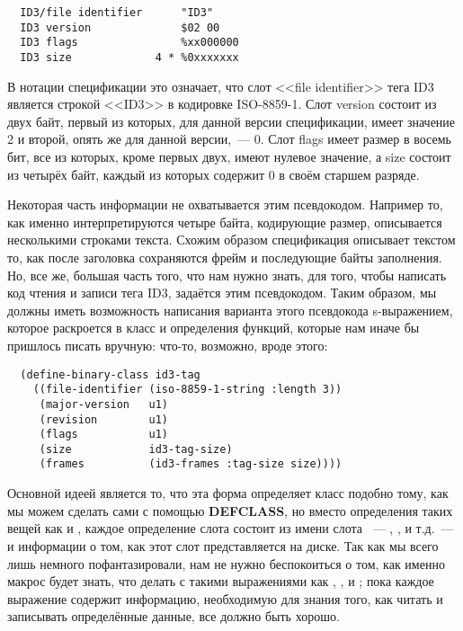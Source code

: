 \begin{verbatim}
  ID3/file identifier      "ID3"
  ID3 version              $02 00
  ID3 flags                %xx000000
  ID3 size             4 * %0xxxxxxx
\end{verbatim}

В нотации спецификации это означает, что слот <<file identifier>> тега ID3 является строкой
<<ID3>> в кодировке ISO-8859-1. Слот version состоит из двух байт, первый из которых, для
данной версии спецификации, имеет значение 2 и второй, опять же для данной версии,~---
0. Слот flags имеет размер в восемь бит, все из которых, кроме первых двух, имеют нулевое
значение, а size состоит из четырёх байт, каждый из которых содержит 0 в своём старшем
разряде.

Некоторая часть информации не охватывается этим псевдокодом. Например то, как именно
интерпретируются четыре байта, кодирующие размер, описывается несколькими строками
текста. Схожим образом спецификация описывает текстом то, как после заголовка сохраняются
фрейм и последующие байты заполнения. Но, все же, большая часть того, что нам нужно знать,
для того, чтобы написать код чтения и записи тега ID3, задаётся этим псевдокодом. Таким
образом, мы должны иметь возможность написания варианта этого псевдокода s-выражением,
которое раскроется в класс и определения функций, которые нам иначе бы пришлось писать
вручную: что-то, возможно, вроде этого:

\begin{lstlisting}
  (define-binary-class id3-tag
    ((file-identifier (iso-8859-1-string :length 3))
     (major-version   u1)
     (revision        u1)
     (flags           u1)
     (size            id3-tag-size)
     (frames          (id3-frames :tag-size size))))
\end{lstlisting}

Основной идеей является то, что эта форма определяет класс  подобно тому,
как мы можем сделать сами с помощью \textbf{DEFCLASS}, но вместо определения таких вещей
как  и , каждое определение слота состоит из имени слота
~--- , , и т.д.~--- и информации о том, как этот
слот представляется на диске. Так как мы всего лишь немного пофантазировали, нам не нужно
беспокоиться о том, как именно макрос  будет знать, что делать с
такими выражениями как , ,
 и ; пока каждое выражение содержит
информацию, необходимую для знания того, как читать и записывать определённые данные, все
должно быть хорошо.

